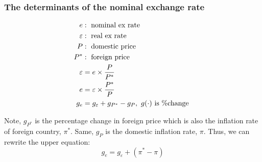 \documentclass[12pt]{article}
\begin{document}
\begin{figure}[H]
\end{figure}





\subsubsection{The determinants of the nominal exchange rate}
\begin{align*}
e&: \text{ nominal ex rate }\\
\varepsilon&: \text{ real ex rate }\\
P&: \text{ domestic price }\\
P^{*}&: \text{ foreign price }\\
\varepsilon &= e  \times  \frac{P}{P^{*}}\\
e &= \varepsilon  \times  \frac{P^{*}}{P}\\
g_{e} &= g_{\varepsilon} + g_{P^{*}} - g_{P}, \text{ $ g(\cdot ) $ is \%change }
\end{align*}




Note, $ g_{P^{*}} $ is the percentage change in foreign price which is also the
inflation rate of foreign country, $ \pi^{*} $. Same, $ g_{P} $ is the domestic 
inflation rate, $ \pi $. Thus, we can rewrite the upper equation:
\begin{equation*}
g_{e} = g_{\varepsilon} + (\pi^{*} - \pi)
\end{equation*}
\end{document}
